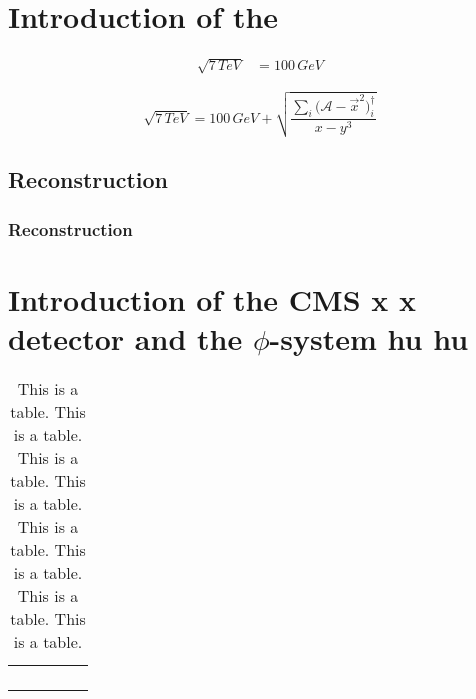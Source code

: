\chapter{Introduction of the}

\lipsum[1]

\begin{align}
\sqrt{7\,TeV} & =100\,{GeV}
\end{align}


\lipsum[4]

\lipsum[2]

\lipsum[1]

\begin{equation}
\sqrt{7\,TeV}=100\,{GeV}+\sqrt{\frac{\sum_{i}\Big(\mathcal{A}-\vec{x}^{2}\Big)_{i}^{\dagger}}{x-y^{3}}}
\end{equation}


\lipsum[4]


\section{Reconstruction}


\subsection{Reconstruction}

\lipsum[2]

\lipsum[1]


\chapter{Introduction of the CMS x x detector and the $\phi$-system hu hu}

\lipsum[4]

\lipsum[2]

\lipsum[2]

\lipsum[1]

\lipsum[2]

\begin{table}[th]
\caption{This is a table. This is a table. This is a table. This is a table.
This is a table. This is a table. This is a table. This is a table.}


\centering{}%
\begin{tabular}{|c|c|c|c|c|}
\hline 
 &  &  &  & \tabularnewline
\hline 
\hline 
 &  &  &  & \tabularnewline
\hline 
 &  &  &  & \tabularnewline
\hline 
 &  &  &  & \tabularnewline
\hline 
 &  &  &  & \tabularnewline
\hline 
\end{tabular}
\end{table}


